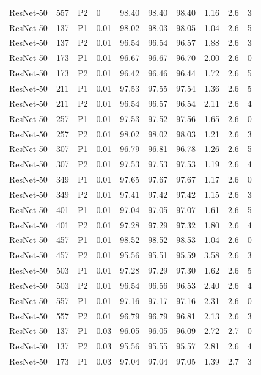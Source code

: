 {\begin{longtable}{lrllrrrrrr}
ResNet-50 & 557 & P2 & 0 & 98.40 & 98.40 & 98.40 & 1.16 & 2.6 & 3 \\
ResNet-50 & 137 & P1 & 0.01 & 98.02 & 98.03 & 98.05 & 1.04 & 2.6 & 5 \\
ResNet-50 & 137 & P2 & 0.01 & 96.54 & 96.54 & 96.57 & 1.88 & 2.6 & 3 \\
ResNet-50 & 173 & P1 & 0.01 & 96.67 & 96.67 & 96.70 & 2.00 & 2.6 & 0 \\
ResNet-50 & 173 & P2 & 0.01 & 96.42 & 96.46 & 96.44 & 1.72 & 2.6 & 5 \\
ResNet-50 & 211 & P1 & 0.01 & 97.53 & 97.55 & 97.54 & 1.36 & 2.6 & 5 \\
ResNet-50 & 211 & P2 & 0.01 & 96.54 & 96.57 & 96.54 & 2.11 & 2.6 & 4 \\
ResNet-50 & 257 & P1 & 0.01 & 97.53 & 97.52 & 97.56 & 1.65 & 2.6 & 0 \\
ResNet-50 & 257 & P2 & 0.01 & 98.02 & 98.02 & 98.03 & 1.21 & 2.6 & 3 \\
ResNet-50 & 307 & P1 & 0.01 & 96.79 & 96.81 & 96.78 & 1.26 & 2.6 & 5 \\
ResNet-50 & 307 & P2 & 0.01 & 97.53 & 97.53 & 97.53 & 1.19 & 2.6 & 4 \\
ResNet-50 & 349 & P1 & 0.01 & 97.65 & 97.67 & 97.67 & 1.17 & 2.6 & 0 \\
ResNet-50 & 349 & P2 & 0.01 & 97.41 & 97.42 & 97.42 & 1.15 & 2.6 & 3 \\
ResNet-50 & 401 & P1 & 0.01 & 97.04 & 97.05 & 97.07 & 1.61 & 2.6 & 5 \\
ResNet-50 & 401 & P2 & 0.01 & 97.28 & 97.29 & 97.32 & 1.80 & 2.6 & 4 \\
ResNet-50 & 457 & P1 & 0.01 & 98.52 & 98.52 & 98.53 & 1.04 & 2.6 & 0 \\
ResNet-50 & 457 & P2 & 0.01 & 95.56 & 95.51 & 95.59 & 3.58 & 2.6 & 3 \\
ResNet-50 & 503 & P1 & 0.01 & 97.28 & 97.29 & 97.30 & 1.62 & 2.6 & 5 \\
ResNet-50 & 503 & P2 & 0.01 & 96.54 & 96.56 & 96.53 & 2.40 & 2.6 & 4 \\
ResNet-50 & 557 & P1 & 0.01 & 97.16 & 97.17 & 97.16 & 2.31 & 2.6 & 0 \\
ResNet-50 & 557 & P2 & 0.01 & 96.79 & 96.79 & 96.81 & 2.13 & 2.6 & 3 \\
ResNet-50 & 137 & P1 & 0.03 & 96.05 & 96.05 & 96.09 & 2.72 & 2.7 & 0 \\
ResNet-50 & 137 & P2 & 0.03 & 95.56 & 95.55 & 95.57 & 2.81 & 2.6 & 4 \\
ResNet-50 & 173 & P1 & 0.03 & 97.04 & 97.04 & 97.05 & 1.39 & 2.7 & 3 \\

\end{longtable}}

